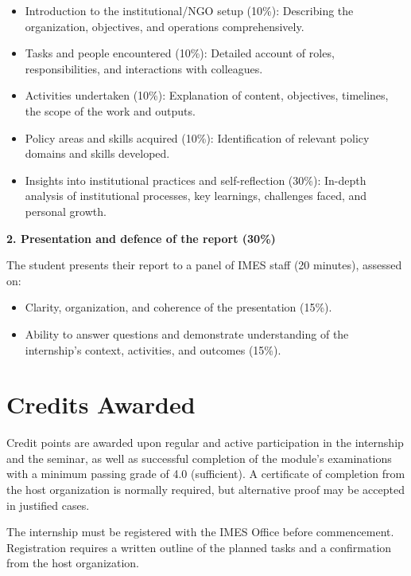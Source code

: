 \documentclass[
  letterpaper,
  10pt,
  openany]{book}
\providecommand{\tightlist}{%
  \setlength{\itemsep}{0pt}\setlength{\parskip}{0pt}}\usepackage{longtable,booktabs,array}
\begin{document}
\begin{itemize}
\tightlist
\item
  Introduction to the institutional/NGO setup (10\%): Describing the
  organization, objectives, and operations comprehensively.
\item
  Tasks and people encountered (10\%): Detailed account of roles,
  responsibilities, and interactions with colleagues.
\item
  Activities undertaken (10\%): Explanation of content, objectives,
  timelines, the scope of the work and outputs.
\item
  Policy areas and skills acquired (10\%): Identification of relevant
  policy domains and skills developed.
\item
  Insights into institutional practices and self-reflection (30\%):
  In-depth analysis of institutional processes, key learnings,
  challenges faced, and personal growth.
\end{itemize}

\textbf{2. Presentation and defence of the report (30\%)}

The student presents their report to a panel of IMES staff (20 minutes),
assessed on:

\begin{itemize}
\tightlist
\item
  Clarity, organization, and coherence of the presentation (15\%).
\item
  Ability to answer questions and demonstrate understanding of the
  internship's context, activities, and outcomes (15\%).
\end{itemize}

\section*{Credits Awarded}\label{credits-awarded-6}


Credit points are awarded upon regular and active participation in the
internship and the seminar, as well as successful completion of the
module's examinations with a minimum passing grade of 4.0 (sufficient).
A certificate of completion from the host organization is normally
required, but alternative proof may be accepted in justified cases.

The internship must be registered with the IMES Office before
commencement. Registration requires a written outline of the planned
tasks and a confirmation from the host organization.
\end{document}
